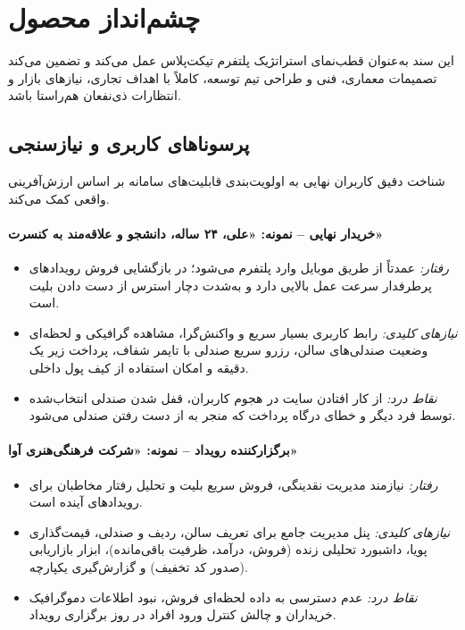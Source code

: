 \documentclass[12pt,a4paper]{article}
\begin{document}
\section{چشم‌انداز محصول}
\label{sec:vision}

این سند به‌عنوان قطب‌نمای استراتژیک پلتفرم تیکت‌پلاس عمل می‌کند و تضمین می‌کند
تصمیمات معماری، فنی و طراحی تیم توسعه، کاملاً با اهداف تجاری، نیازهای بازار و
انتظارات ذی‌نفعان هم‌راستا باشد.

\subsection{پرسوناهای کاربری و نیازسنجی}
شناخت دقیق کاربران نهایی به اولویت‌بندی قابلیت‌های سامانه بر اساس ارزش‌آفرینی
واقعی کمک می‌کند.

\paragraph{خریدار نهایی -- نمونه: «علی، ۲۴ ساله، دانشجو و علاقه‌مند به کنسرت»}
\begin{itemize}
  \item \textit{رفتار:} عمدتاً از طریق موبایل وارد پلتفرم می‌شود؛ در بازگشایی
  فروش رویدادهای پرطرفدار سرعت عمل بالایی دارد و به‌شدت دچار استرس از دست
  دادن بلیت است.
  \item \textit{نیازهای کلیدی:} رابط کاربری بسیار سریع و واکنش‌گرا، مشاهده
  گرافیکی و لحظه‌ای وضعیت صندلی‌های سالن، رزرو سریع صندلی با تایمر شفاف،
  پرداخت زیر یک دقیقه و امکان استفاده از کیف پول داخلی.
  \item \textit{نقاط درد:} از کار افتادن سایت در هجوم کاربران، قفل شدن صندلی
  انتخاب‌شده توسط فرد دیگر و خطای درگاه پرداخت که منجر به از دست رفتن صندلی
  می‌شود.
\end{itemize}

\paragraph{برگزارکننده رویداد -- نمونه: «شرکت فرهنگی‌هنری آوا»}
\begin{itemize}
  \item \textit{رفتار:} نیازمند مدیریت نقدینگی، فروش سریع بلیت و تحلیل رفتار
  مخاطبان برای رویدادهای آینده است.
  \item \textit{نیازهای کلیدی:} پنل مدیریت جامع برای تعریف سالن، ردیف و
  صندلی، قیمت‌گذاری پویا، داشبورد تحلیلی زنده (فروش، درآمد، ظرفیت باقی‌مانده)،
  ابزار بازاریابی (صدور کد تخفیف) و گزارش‌گیری یکپارچه.
  \item \textit{نقاط درد:} عدم دسترسی به داده لحظه‌ای فروش، نبود اطلاعات
  دموگرافیک خریداران و چالش کنترل ورود افراد در روز برگزاری رویداد.
\end{itemize}
\end{document}
